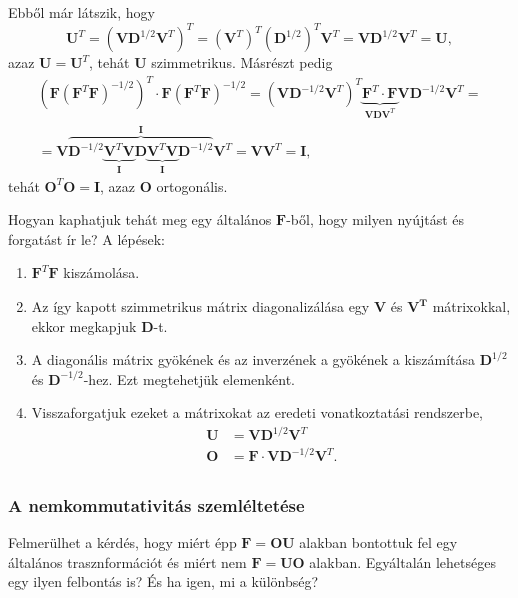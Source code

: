 \documentclass[12pt,a4paper]{scrartcl}
\let\mathbf\bm
\begin{document}
Ebből már látszik, hogy 
\[{{\mathbf{U}}^T} = {\left( {{\mathbf{V}}{{\mathbf{D}}^{1/2}}{{\mathbf{V}}^T}} \right)^T} = {\left( {{{\mathbf{V}}^T}} \right)^T}{\left( {{{\mathbf{D}}^{1/2}}} \right)^T}{{\mathbf{V}}^T} = {\mathbf{V}}{{\mathbf{D}}^{1/2}}{{\mathbf{V}}^T} = {{\mathbf{U}}},\]
azaz ${\mathbf{U}} = {{\mathbf{U}}^T}$, tehát ${\mathbf{U}}$ szimmetrikus. Másrészt pedig
\begin{multline*}
{\left( {{\mathbf{F}}{{\left( {{{\mathbf{F}}^T}{\mathbf{F}}} \right)}^{ - 1/2}}} \right)^T} \cdot {\mathbf{F}}{\left( {{{\mathbf{F}}^T}{\mathbf{F}}} \right)^{ - 1/2}} = {\left( {{\mathbf{V}}{{\mathbf{D}}^{ - 1/2}}{{\mathbf{V}}^T}} \right)^T}\underbrace {{{\mathbf{F}}^T} \cdot {\mathbf{F}}}_{{\mathbf{VD}}{{\mathbf{V}}^T}}{\mathbf{V}}{{\mathbf{D}}^{ - 1/2}}{{\mathbf{V}}^T} = \\ = {\mathbf{V}}\overbrace {{{\mathbf{D}}^{ - 1/2}}\underbrace {{{\mathbf{V}}^T}{\mathbf{V}}}_{\mathbf{I}}{\mathbf{D}}\underbrace {{{\mathbf{V}}^T}{\mathbf{V}}}_{\mathbf{I}}{{\mathbf{D}}^{ - 1/2}}}^{\mathbf{I}}{{\mathbf{V}}^T} = {\mathbf{V}}{{\mathbf{V}}^T} = {\mathbf{I}},
\end{multline*}
tehát ${{\mathbf{O}}^T}{\mathbf{O}} = {\mathbf{I}}$, azaz ${\mathbf{O}}$ ortogonális.

Hogyan kaphatjuk tehát meg egy általános ${\mathbf{F}}$-ből, hogy milyen nyújtást és forgatást ír le? A lépések:
\begin{enumerate}
\item ${{{\mathbf{F}}^T}{\mathbf{F}}}$ kiszámolása.
\item Az így kapott szimmetrikus mátrix diagonalizálása egy ${\mathbf{V}}$ és ${\mathbf{V^T}}$ mátrixokkal, ekkor megkapjuk ${\mathbf{D}}$-t.
\item A diagonális mátrix gyökének és az inverzének a gyökének a kiszámítása ${{\mathbf{D}}^{1/2}}$ és ${{\mathbf{D}}^{ - 1/2}}$-hez. Ezt megtehetjük elemenként.
\item Visszaforgatjuk ezeket a mátrixokat az eredeti vonatkoztatási rendszerbe, 
\[\begin{aligned}
  {\mathbf{U}} &  = {\mathbf{V}}{{\mathbf{D}}^{1/2}}{{\mathbf{V}}^T} \\ 
  {\mathbf{O}} &  = {\mathbf{F}} \cdot {\mathbf{V}}{{\mathbf{D}}^{ - 1/2}}{{\mathbf{V}}^T}. \\ 
\end{aligned} \]
\end{enumerate}

\subsubsection{A nemkommutativitás szemléltetése}
Felmerülhet a kérdés, hogy miért épp ${\mathbf{F}} = {\mathbf{OU}}$ alakban bontottuk fel egy általános trasznformációt és miért nem ${\mathbf{F}} = {\mathbf{UO}}$ alakban. Egyáltalán lehetséges egy ilyen felbontás is? És ha igen, mi a különbség?
\end{document}
